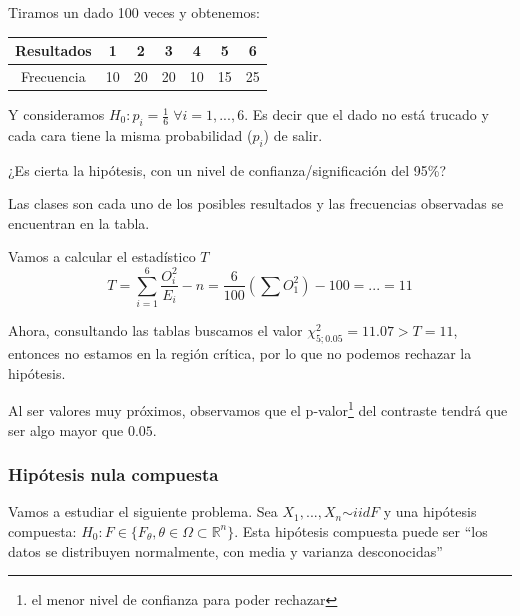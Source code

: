 \begin{example}
Tiramos un dado 100 veces y obtenemos:

\begin{tabular}{|c|c|c|c|c|c|c|}
\hline
Resultados & 1 & 2 & 3 & 4 & 5 & 6 \\
\hline
Frecuencia & 10 & 20 & 20 & 10 & 15 & 25\\
\hline
\end{tabular}

Y consideramos $H_0: p_i=\frac{1}{6} \; \forall i=1,...,6$. Es decir que el dado no está trucado y cada cara tiene la misma probabilidad ($p_i$) de salir.

¿Es cierta la hipótesis, con un nivel de confianza/significación del 95\%?


Las clases son cada uno de los posibles resultados y las frecuencias observadas se encuentran en la tabla.

Vamos a calcular el estadístico $T$ \[T = \sum_{i=1}^6 \frac{O_i^2}{E_i} - n = \frac{6}{100} (\sum O_1^2) - 100 = ... = 11\]

Ahora, consultando las tablas buscamos el valor $\chi^2_{5;0.05} = 11.07 > T = 11$, entonces no estamos en la región crítica, por lo que no podemos rechazar la hipótesis.

Al ser valores muy próximos, observamos que el p-valor\footnote{el menor nivel de confianza para poder rechazar} del contraste tendrá que ser algo mayor que $0.05$.

\end{example}







\subsubsection{Hipótesis nula compuesta}

Vamos a estudiar el siguiente problema. Sea $X_1,...,X_n \overset{}{\sim}{iid}  F$ y una hipótesis compuesta: $H_0: F\in \{ F_{\theta}, \theta\in Ω \subset ℝ^n\}$. Esta hipótesis compuesta puede ser ``los datos se distribuyen normalmente, con media y varianza desconocidas''

